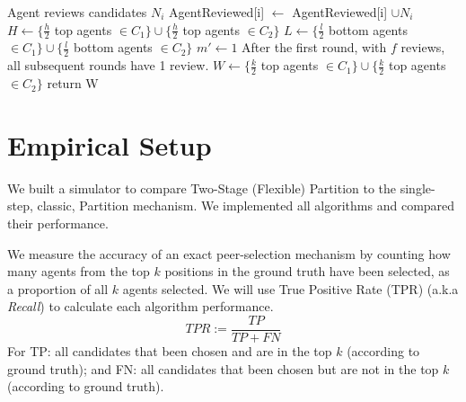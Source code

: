 \documentclass[letterpaper]{article} %
\begin{document}
\begin{algorithm}[t]
\begin{algorithmic}[1]
 \State Agent reviews candidates $N_{i}$ %
 \State AgentReviewed[i] $\gets$ AgentReviewed[i] $\cup N_{i}$
 \EndFor
 \State $H \gets \{ \frac{h}{2}$ top agents $\in C_{1} \} \cup \{ \frac{h}{2}$ top agents $\in C_{2} \}$
 \State $L \gets \{\frac{l}{2}$ bottom agents $\in C_{1} \} \cup \{ \frac{l}{2}$ bottom agents $\in C_{2} \}$
 \State $m' \gets1$ \Comment After the first round, with $f$ reviews, all subsequent rounds have 1 review.
\EndFor
\State $W \gets \{ \frac{k}{2}$ top agents $\in C_{1} \} \cup \{ \frac{k}{2}$ top agents $\in C_{2} \}$
\State return W
\end{algorithmic}
\end{algorithm}
\normalsize

\section{Empirical Setup}\label{setup}

We built a simulator to compare Two-Stage (Flexible) Partition to the single-step, classic, Partition mechanism. We implemented all algorithms and compared their performance.

We measure the accuracy of an exact peer-selection mechanism by counting how many agents from the top $k$ positions in the ground truth have been selected, as a proportion of all $k$ agents selected. We will use True Positive Rate (TPR) (a.k.a \emph{Recall}) to calculate each algorithm performance.
\small
$$
 TPR := \frac{TP}{TP + FN}
$$
\normalsize
For TP: all candidates that been chosen and are in the top $k$ (according to ground truth); and
FN: all candidates that been chosen but are not in the top $k$ (according to ground truth).
\end{document}
